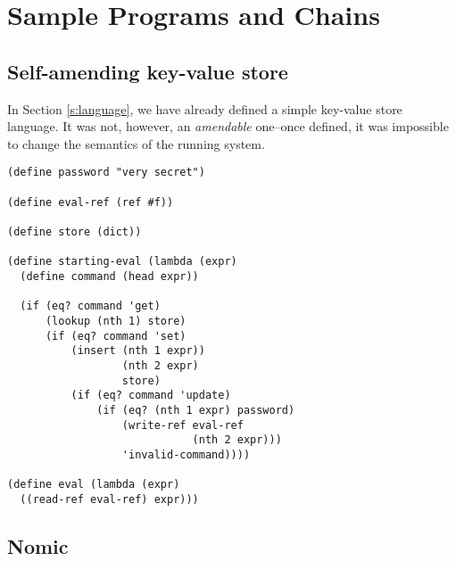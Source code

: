 \section{Sample Programs and Chains}

\subsection{Self-amending key-value store}

In Section \ref{s:language}, we have already defined a simple key-value store
language. It was not, however, an \textit{amendable} one--once defined, it was
impossible to change the semantics of the running system.

\begin{lstlisting}
(define password "very secret")

(define eval-ref (ref #f))

(define store (dict))

(define starting-eval (lambda (expr)
  (define command (head expr))

  (if (eq? command 'get)
      (lookup (nth 1) store)
      (if (eq? command 'set)
          (insert (nth 1 expr))
                  (nth 2 expr)
                  store)
          (if (eq? command 'update)
              (if (eq? (nth 1 expr) password)
                  (write-ref eval-ref
                             (nth 2 expr)))
                  'invalid-command))))

(define eval (lambda (expr)
  ((read-ref eval-ref) expr)))
\end{lstlisting}


\subsection{Nomic}
\label{s:examples}
